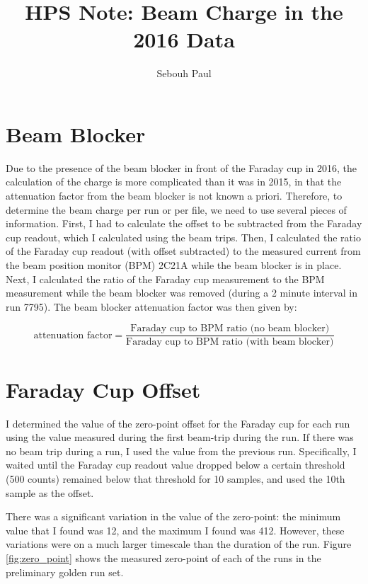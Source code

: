 \documentclass[11pt]{article}
\title{HPS Note:  Beam Charge in the 2016 Data}
\author{Sebouh Paul}
\date{}                                           %
\begin{document}
\maketitle

\section{Beam Blocker}
Due to the presence of the beam blocker in front of the Faraday cup in 2016, the calculation of the charge is more complicated than it was in 2015, in that the attenuation factor from the beam blocker is not known a priori.  Therefore, to determine the beam charge per run or per file, we need to use several pieces of information.  First, I had to calculate the offset to be subtracted from the Faraday cup readout, which I calculated using the beam trips.  Then, I calculated the ratio of the Faraday cup readout (with offset subtracted) to the measured current from the beam position monitor (BPM) 2C21A while the beam blocker is in place.  Next, I calculated the ratio of the Faraday cup measurement to the BPM measurement while the beam blocker was removed (during a 2 minute interval in run 7795).  The beam blocker attenuation factor was then given by:

\begin{equation}\label{eq:attenuation}
\textrm{attenuation factor} = \frac{\textrm{Faraday cup to BPM ratio (no beam blocker)}}{\textrm{Faraday cup to BPM ratio (with beam blocker)}}
\end{equation}

\section{Faraday Cup Offset}
I determined the value of the zero-point offset for the Faraday cup for each run using the value measured during the first beam-trip during the run.  If there was no beam trip during a run, I used the value from the previous run.  Specifically, I waited until the Faraday cup readout value dropped below a certain threshold (500 counts) remained below that threshold for 10 samples, and used the 10th sample as the offset.  

There was a significant variation in the value of the zero-point: the minimum value that I found was 12, and the maximum I found was 412.  However, these variations were on a much larger timescale than the duration of the run.  
Figure \ref{fig:zero_point} shows the measured zero-point of each of the runs in the preliminary golden run set.  
\end{document}
